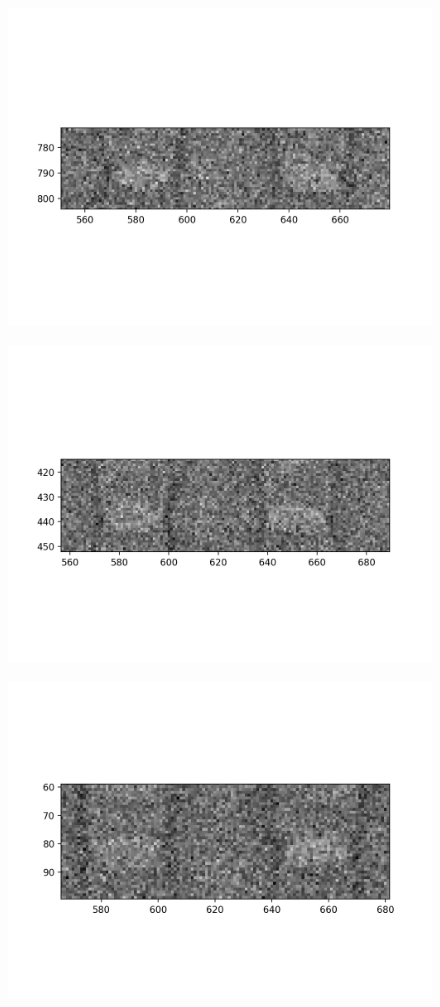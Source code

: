 \documentclass[10pt,a4paper]{article}
\begin{document}
\begin{figure}
	\includegraphics{data/image_stamps/a4}
\end{figure}
\begin{figure}
	\includegraphics{data/image_stamps/a5}
\end{figure}
\begin{figure}
	\includegraphics{data/image_stamps/a6}
\end{figure}
\end{document}
